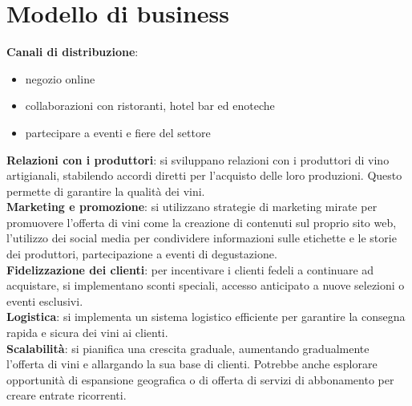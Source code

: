 \documentclass[12pt, a4paper]{article}
\newcommand{\meskip}{\medskip \\}
\begin{document}
\section*{Modello di business}


\textbf{Canali di distribuzione}:
\begin{itemize}[itemsep=-5pt, topsep=0pt]
    \item negozio online
    \item collaborazioni con ristoranti, hotel bar ed enoteche
    \item partecipare a eventi e fiere del settore
\end{itemize}\medskip
\textbf{Relazioni con i produttori}: si sviluppano relazioni con i produttori di vino artigianali, stabilendo accordi diretti per l'acquisto delle loro produzioni. Questo permette di garantire la qualità dei vini.\meskip
\textbf{Marketing e promozione}: si utilizzano strategie di marketing mirate per promuovere l'offerta di vini come la creazione di contenuti sul proprio sito web, l'utilizzo dei social media per condividere informazioni sulle etichette e le storie dei produttori, partecipazione a eventi di degustazione.\meskip
\textbf{Fidelizzazione dei clienti}: per incentivare i clienti fedeli a continuare ad acquistare, si implementano sconti speciali, accesso anticipato a nuove selezioni o eventi esclusivi.\meskip
\textbf{Logistica}: si implementa un sistema logistico efficiente per garantire la consegna rapida e sicura dei vini ai clienti.\meskip
\textbf{Scalabilità}: si pianifica una crescita graduale, aumentando gradualmente l'offerta di vini e allargando la sua base di clienti. Potrebbe anche esplorare opportunità di espansione geografica o di offerta di servizi di abbonamento per creare entrate ricorrenti.
\newpage
\end{document}
